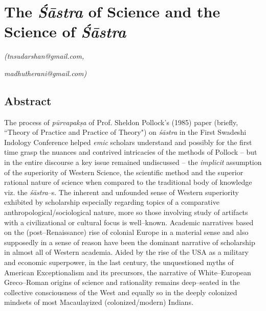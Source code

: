 
\chapter{The \textit{Śāstra} of Science and the Science of \textit{Śāstra}}\label{chapter9}


\begin{flushright}
\textit{(tnsudarshan@gmail.com,}
\end{flushright}

\begin{flushright}
\textit{madhutherani@gmail.com)}
\end{flushright}


\section*{Abstract}

The process of \textit{pūrvapakṣa} of Prof. Sheldon Pollock’s (1985) paper (briefly, ``Theory of Practice and Practice of Theory") on \textit{śāstra} in the First Swadeshi Indology Conference helped \textit{emic} scholars understand and possibly for the first time grasp the nuances and contrived intricacies of the methods of Pollock – but in the entire discourse a key issue remained undiscussed – the \textit{implicit} assumption of the superiority of Western Science, the scientific method and the superior rational nature of science when compared to the traditional body of knowledge viz. the \textit{śāstra}–s. The inherent and unfounded sense of Western superiority exhibited by scholarship especially regarding topics of a comparative anthropological/sociological nature, more so those involving study of artifacts with a civilizational or cultural focus is well–known. Academic narratives based on the (post–Renaissance) rise of colonial Europe in a material sense and also supposedly in a sense of reason have been the dominant narrative of scholarship in almost all of Western academia. Aided by the rise of the USA as a military and economic superpower, in the last century, the unquestioned myths of American Exceptionalism and its precursors, the narrative of White–European Greco–Roman origins of science and rationality remains deep–seated in the collective consciousness of the West and equally so in the deeply colonized mindsets of most Macaulayized (colonized/modern) Indians.

